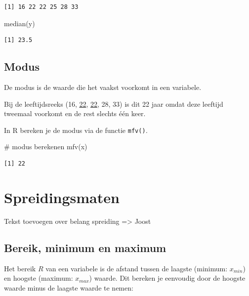 \documentclass[
  letterpaper,
  DIV=11,
  numbers=noendperiod]{scrreprt}
\newenvironment{Shaded}{\begin{snugshade}}{\end{snugshade}}
\newcommand{\CommentTok}[1]{\textcolor[rgb]{0.37,0.37,0.37}{#1}}
\newcommand{\FunctionTok}[1]{\textcolor[rgb]{0.28,0.35,0.67}{#1}}
\newcommand{\NormalTok}[1]{\textcolor[rgb]{0.00,0.23,0.31}{#1}}
\begin{document}
\begin{verbatim}
[1] 16 22 22 25 28 33
\end{verbatim}

\begin{Shaded}
\begin{Highlighting}[]
\FunctionTok{median}\NormalTok{(y)}
\end{Highlighting}
\end{Shaded}

\begin{verbatim}
[1] 23.5
\end{verbatim}

\subsection{Modus}\label{modus}

De modus is de waarde die het vaakst voorkomt in een variabele.

Bij de leeftijdsreeks (16, \ul{22}, \ul{22}, 28, 33) is dit 22 jaar
omdat deze leeftijd tweemaal voorkomt en de rest slechts één keer.

In R bereken je de modus via de functie \texttt{mfv()}\emph{.}

\begin{Shaded}
\begin{Highlighting}[]
\CommentTok{\# modus berekenen}
\FunctionTok{mfv}\NormalTok{(x)}
\end{Highlighting}
\end{Shaded}

\begin{verbatim}
[1] 22
\end{verbatim}

\section{Spreidingsmaten}\label{spreidingsmaten}

Tekst toevoegen over belang spreiding =\textgreater{} Joost

\subsection{Bereik, minimum en maximum}\label{bereik-minimum-en-maximum}

Het bereik \(R\) van een variabele is de afstand tussen de laagste
(minimum: \(x_{min}\)) en hoogste (maximum: \(x_{max}\)) waarde. Dit
bereken je eenvoudig door de hoogste waarde minus de laagste waarde te
nemen:
\end{document}
